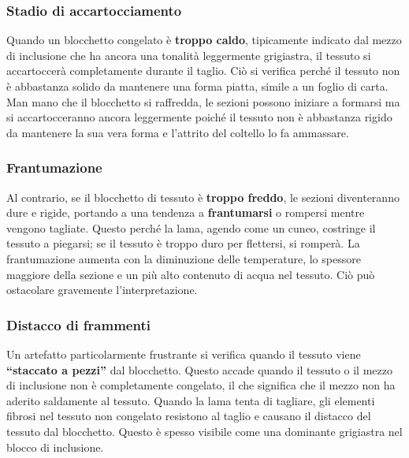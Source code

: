 \subsubsection{Stadio di accartocciamento}
Quando un blocchetto congelato è \textbf{troppo caldo}, tipicamente indicato dal mezzo di inclusione che ha ancora una tonalità leggermente grigiastra, il tessuto si accartoccerà completamente durante il taglio.  Ciò si verifica perché il tessuto non è abbastanza solido da mantenere una forma piatta, simile a un foglio di carta.  Man mano che il blocchetto si raffredda, le sezioni possono iniziare a formarsi ma si accartocceranno ancora leggermente poiché il tessuto non è abbastanza rigido da mantenere la sua vera forma e l'attrito del coltello lo fa ammassare. 

\subsubsection{Frantumazione}
Al contrario, se il blocchetto di tessuto è \textbf{troppo freddo}, le sezioni diventeranno dure e rigide, portando a una tendenza a \textbf{frantumarsi} o rompersi mentre vengono tagliate.  Questo perché la lama, agendo come un cuneo, costringe il tessuto a piegarsi;  se il tessuto è troppo duro per flettersi, si romperà.  La frantumazione aumenta con la diminuzione delle temperature, lo spessore maggiore della sezione e un più alto contenuto di acqua nel tessuto. Ciò può ostacolare gravemente l'interpretazione. 

\subsubsection{Distacco di frammenti}
Un artefatto particolarmente frustrante si verifica quando il tessuto viene \textbf{``staccato a pezzi''} dal blocchetto.  Questo accade quando il tessuto o il mezzo di inclusione non è completamente congelato, il che significa che il mezzo non ha aderito saldamente al tessuto.  Quando la lama tenta di tagliare, gli elementi fibrosi nel tessuto non congelato resistono al taglio e causano il distacco del tessuto dal blocchetto.  Questo è spesso visibile come una dominante grigiastra nel blocco di inclusione. 

